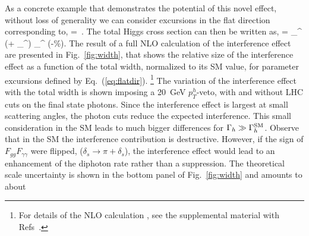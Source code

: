 As a concrete example that demonstrates the potential of this novel effect, without loss of generality
we can consider excursions in the flat direction corresponding to,
\beq
{}
 =  \,.
\label{eq:flatdir}
\eeq
The total Higgs cross section can then be written as,
\beq
\sigma = \sigma_^\!\! \left(\!\!+\!  {\sigma_^}\right)
\simeq \sigma_^ \!\!\left(\!\!-\%\right)\!\!.\label{eq:deltasigma}
\eeq
%
The result of a full NLO calculation of the interference effect are presented in Fig.~\ref{fig:width}, that shows the relative size of the interference effect as a function of the total width, normalized to its SM value, for parameter excursions defined by Eq.~(\ref{eq:flatdir}). 
\footnote{For details of the 
NLO calculation
, see the supplemental material 
with Refs~\cite{Bern:1991aq,Bern:2001df,Bern:1995db,Bern:1993mq,Bern:2002jx,deFlorian:2013psa,Catani:1996vz,Campbell:2011bn,Dulat:2015mca,Djouadi:1997rj,Degrassi:2005mc,Passarino:2007fp,Dittmaier:2011ti}.}
The variation of the interference effect with the total width is shown imposing a 20~GeV $p_T^{h}$-veto, with and without LHC cuts on the final state photons. %
Since the interference effect is largest at small scattering angles, the photon cuts reduce the expected interference.  
This small consideration in the SM leads to much
bigger differences for $\Gamma_h \gg \Gamma_h^{\rm SM}$.
Observe that in the SM the interference contribution is destructive. However,  if the sign of $F_{gg} F_{\gamma\gamma}$ were flipped, ($\delta_s\to \pi+\delta_s$), the interference effect would lead to an enhancement of the diphoton rate rather than a suppression. 
The theoretical scale uncertainty is shown in the bottom panel of Fig.~\ref{fig:width} and amounts to about 
